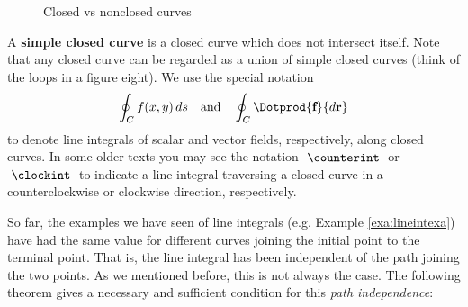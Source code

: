 \begin{figure}[h]
 \centering
 \qquad\qquad
 \caption[]{\quad Closed vs nonclosed curves}
 \label{fig:closedcurve}
\end{figure}

A \textbf{simple closed curve} is a closed curve which does not intersect itself. Note that any closed curve can be
regarded as a union of simple closed curves (think of the loops in a figure eight). We use the special notation
\begin{displaymath}
 \oint_C f(x,y)\,ds \quad\text{and}\quad \oint_C \Dotprod{\textbf{f}}{d\textbf{r}}
\end{displaymath}
to denote line integrals of scalar and vector fields, respectively, along closed curves. In some older texts you may see the notation $\;\displaystyle\counterint\;$ or
$\;\displaystyle\clockint\;$ to indicate a line integral traversing a closed curve in a counterclockwise or
clockwise direction, respectively.

So far, the examples we have seen of line integrals (e.g. Example \ref{exa:lineintexa}) have had the same value
for different curves joining the initial point to the terminal point. That is, the line integral has been
independent of the path joining the two points. As we mentioned before, this is not always the case. The following
theorem gives a necessary and sufficient condition for this \emph{path independence}:

